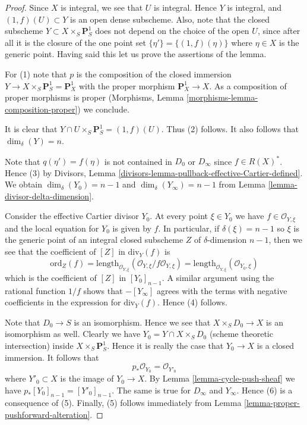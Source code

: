 \begin{proof}
Since $X$ is integral, we see that $U$ is integral.
Hence $Y$ is integral, and $(1, f)(U) \subset Y$ is an open dense subscheme.
Also, note that the closed subscheme $Y \subset X \times_S \mathbf{P}^1_S$
does not depend on the choice of the open $U$, since after all it is
the closure of the one point set $\{\eta'\} = \{(1, f)(\eta)\}$
where $\eta \in X$ is the generic point. Having said this let us
prove the assertions of the lemma.

\medskip\noindent
For (1) note that $p$ is the composition of the closed immersion
$Y \to X \times_S \mathbf{P}^1_S = \mathbf{P}^1_X$ with the proper
morphism $\mathbf{P}^1_X \to X$. As a composition of proper morphisms
is proper (Morphisms, Lemma \ref{morphisms-lemma-composition-proper})
we conclude.

\medskip\noindent
It is clear that $Y \cap U \times_S \mathbf{P}^1_S = (1, f)(U)$.
Thus (2) follows. It also follows that $\dim_\delta(Y) = n$.

\medskip\noindent
Note that $q(\eta') = f(\eta)$ is not contained in $D_0$ or $D_\infty$
since $f \in R(X)^*$. Hence (3) by
Divisors, Lemma \ref{divisors-lemma-pullback-effective-Cartier-defined}.
We obtain $\dim_\delta(Y_0) = n - 1$
and $\dim_\delta(Y_\infty) = n - 1$ from
Lemma \ref{lemma-divisor-delta-dimension}.

\medskip\noindent
Consider the effective Cartier divisor $Y_0$.
At every point $\xi \in Y_0$ we have $f \in \mathcal{O}_{Y, \xi}$ and
the local equation for $Y_0$ is given by $f$.
In particular, if $\delta(\xi) = n - 1$ so $\xi$ is the generic point
of an integral closed subscheme $Z$ of $\delta$-dimension $n - 1$,
then we see that the coefficient of $[Z]$ in $\text{div}_Y(f)$ is
$$
\text{ord}_Z(f) =
\text{length}_{\mathcal{O}_{Y, \xi}}
(\mathcal{O}_{Y, \xi}/f\mathcal{O}_{Y, \xi}) =
\text{length}_{\mathcal{O}_{Y, \xi}}
(\mathcal{O}_{Y_0, \xi})
$$
which is the coefficient of $[Z]$ in $[Y_0]_{n - 1}$. A similar
argument using the rational function $1/f$ shows that
$-[Y_\infty]$ agrees with the terms with negative coefficients in
the expression for $\text{div}_Y(f)$. Hence (4) follows.

\medskip\noindent
Note that $D_0 \to S$ is an isomorphism. Hence we see that
$X \times_S D_0 \to X$ is an isomorphism as well. Clearly
we have $Y_0 = Y \cap X \times_S D_0$ (scheme theoretic intersection)
inside $X \times_S \mathbf{P}^1_S$. Hence it is really the case that
$Y_0 \to X$ is a closed immersion. It follows that
$$
p_*\mathcal{O}_{Y_0} = \mathcal{O}_{Y'_0}
$$
where $Y'_0 \subset X$ is the image of $Y_0 \to X$.
By Lemma \ref{lemma-cycle-push-sheaf} we
have $p_*[Y_0]_{n - 1} = [Y'_0]_{n - 1}$. The same
is true for $D_\infty$ and $Y_\infty$. Hence (6) is a consequence of (5).
Finally, (5) follows immediately from
Lemma \ref{lemma-proper-pushforward-alteration}.
\end{proof}

